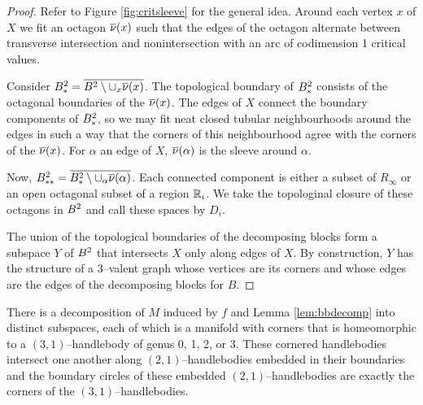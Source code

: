 \begin{proof}
	Refer to Figure \ref{fig:critsleeve} for the general idea.	
	Around each vertex $x$ of $X$ we fit an octagon $\overline{\nu}(x)$ such that the edges of the octagon alternate between transverse intersection and nonintersection with an arc of codimension 1 critical values.
	
	Consider $B^2_*=\overline{B^2\setminus\cup_x \overline{\nu}(x)}$.
	The topological boundary of $B^2_*$ consists of the octagonal boundaries of the $\overline{\nu}(x)$.
	The edges of $X$ connect the boundary components of $B^2_*$, so we may fit neat closed tubular neighbourhoods around the edges in such a way that the corners of this neighbourhood agree with the corners of the $\overline{\nu}(x)$.
	For $\alpha$ an edge of $X$, $\overline{\nu}(\alpha)$ is the sleeve around $\alpha$.
	
	Now, $B^2_{**}=\overline{B^2_*\setminus\cup_\alpha\overline{\nu}(\alpha)}$.
	Each connected component is either a subset of $R_\infty$ or an open octagonal subset of a region $\mathbb{R}_i$.
	We take the topologinal closure of these octagons in $B^2$ and call these spaces by $D_i$.
	
	The union of the topological boundaries of the decomposing blocks form a subspace $Y$ of $B^2$ that intersects $X$ only along edges of $X$.
	By construction, $Y$ has the structure of a 3--valent graph whose vertices are its corners and whose edges are the edges of the decomposing blocks for $B$.
\end{proof}

\begin{lem}
	\label{lem:3bodydecomp}
	There is a decomposition of $M$ induced by $f$ and Lemma \ref{lem:bbdecomp} into distinct subspaces, each of which is a manifold with corners that is homeomorphic to a $(3,1)$--handlebody of genus 0, 1, 2, or 3.
	These cornered handlebodies intersect one another along $(2,1)$--handlebodies embedded in their boundaries and the boundary circles of these embedded $(2,1)$--handlebodies are exactly the corners of the $(3,1)$--handlebodies.
\end{lem}

